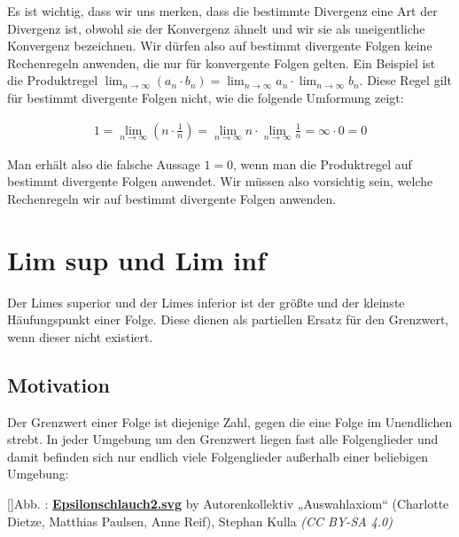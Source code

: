 \documentclass[fontsize=9pt,
               parskip=half-,
               DIV=14,
               listof=chapterentry,
               tocflat]{scrbook}
\newcounter{imagelabel}
\begin{document}
\begin{warning*}
Es ist wichtig, dass wir uns merken, dass die bestimmte Divergenz eine Art der Divergenz ist, obwohl sie der Konvergenz ähnelt und wir sie als uneigentliche Konvergenz bezeichnen. Wir dürfen also auf bestimmt divergente Folgen keine Rechenregeln anwenden, die nur für konvergente Folgen gelten. Ein Beispiel ist die Produktregel $\lim _{n\to \infty }(a_{n}\cdot b_{n})=\lim _{n\to \infty }a_{n}\cdot \lim _{n\to \infty }b_{n}$. Diese Regel gilt für bestimmt divergente Folgen nicht, wie die folgende Umformung zeigt:

\begin{align*}
1=\lim _{n\to \infty }\left(n\cdot {\frac {1}{n}}\right)=\lim _{n\to \infty }n\cdot \lim _{n\to \infty }{\frac {1}{n}}=\infty \cdot 0=0
\end{align*}

Man erhält also die falsche Aussage $1=0$, wenn man die Produktregel auf bestimmt divergente Folgen anwendet. Wir müssen also vorsichtig sein, welche Rechenregeln wir auf bestimmt divergente Folgen anwenden. 

\end{warning*}

\chapter{Lim sup und Lim inf}

Der Limes superior und der Limes inferior ist der größte und der kleinste Häufungspunkt einer Folge. Diese dienen als partiellen Ersatz für den Grenzwert, wenn dieser nicht existiert.

\section{Motivation}

Der Grenzwert einer Folge ist diejenige Zahl, gegen die eine Folge im Unendlichen strebt. In jeder Umgebung um den Grenzwert liegen fast alle Folgenglieder und damit befinden sich nur endlich viele Folgenglieder außerhalb einer beliebigen Umgebung:

[]{Abb. : \protect\href{https://commons.wikimedia.org/wiki/File:Epsilonschlauch2.svg}{\textbf{Epsilonschlauch2.svg}} by Autorenkollektiv „Auswahlaxiom“ (Charlotte Dietze, Matthias Paulsen, Anne Reif), Stephan Kulla \textit{(CC BY-SA 4.0)}}\begin{center}
\end{center}
\end{document}
